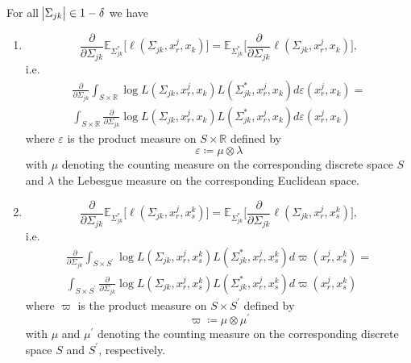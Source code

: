 \begin{lemma}\label{expectation_commutes_case2}
    For all $\abs{\Sigma_{jk}} \in 1-\delta$ we have
    \begin{enumerate}
        \item \begin{equation*}
                \frac{\partial }{\partial \Sigma_{jk}} \mathbb{E}_{\Sigma_{jk}^*} \big[\ell(\Sigma_{jk}, x_r^j,x_k)\big] = \mathbb{E}_{\Sigma_{jk}^*} \Bigg[\frac{\partial }{\partial \Sigma_{jk}} \ell(\Sigma_{jk}, x_r^j,x_k) \Bigg], 
               \end{equation*}
                i.e. 
               \begin{align*}
                    \frac{\partial }{\partial \Sigma_{jk}} \int_{S\times \mathbb{R}} \log L(\Sigma_{jk}, x_r^j,x_k) L(\Sigma_{jk}^*, x_r^j,x_k) d\varepsilon(x_r^j,x_k) = \\
                    \int_{S\times \mathbb{R}} \frac{\partial }{\partial \Sigma_{jk}} \log L(\Sigma_{jk}, x_r^j,x_k) L(\Sigma_{jk}^*, x_r^j,x_k) d\varepsilon(x_r^j,x_k)
               \end{align*}
               where $\varepsilon$ is the product measure on $S \times \mathbb{R}$ defined by
               \begin{equation*}
                    \varepsilon \coloneqq \mu \otimes \lambda
               \end{equation*}
               with $\mu$ denoting the counting measure on the corresponding discrete space $S$ and $\lambda$ the Lebesgue measure on the corresponding Euclidean space.  
    \item \begin{equation*}
                \frac{\partial }{\partial \Sigma_{jk}} \mathbb{E}_{\Sigma_{jk}^*} \big[\ell(\Sigma_{jk}, x^j_r,x^k_s)\big] = \mathbb{E}_{\Sigma_{jk}^*} \Bigg[\frac{\partial }{\partial \Sigma_{jk}} \ell(\Sigma_{jk}, x^j_r,x^k_s) \Bigg], 
           \end{equation*}
           i.e. 
               \begin{align*}
                    \frac{\partial }{\partial \Sigma_{jk}} \int_{S\times S^\prime} \log L(\Sigma_{jk}, x^j_r,x^k_s) L(\Sigma_{jk}^*, x^j_r,x^k_s) d\varpi(x^j_r,x^k_s) = \\
                    \int_{S\times S^\prime} \frac{\partial }{\partial \Sigma_{jk}} \log L(\Sigma_{jk}, x^j_r,x^k_s) L(\Sigma_{jk}^*, x^j_r,x^k_s) d\varpi(x^j_r,x^k_s)
               \end{align*}
               where $\varpi$ is the product measure on $S \times S^\prime$ defined by
               \begin{equation*}
                    \varpi \coloneqq \mu \otimes \mu^\prime
               \end{equation*}
               with $\mu$ and $\mu^\prime$ denoting the counting measure on the corresponding discrete space $S$ and $S^\prime$, respectively.
    \end{enumerate}
    

\end{lemma}
